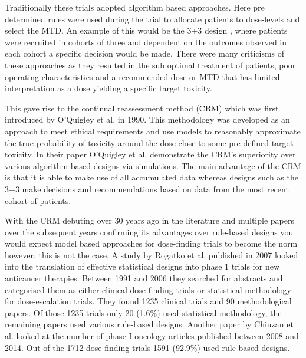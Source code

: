 Traditionally these trials adopted algorithm based approaches. Here pre determined rules were used during the trial to allocate patients to dose-levels and select the MTD. An example of this would be the 3+3 design \cite{storerDesignAnalysisPhase1989}, where patients were recruited in cohorts of three and dependent on the outcomes observed in each cohort a specific decision would be made. There were many criticisms of these approaches as they resulted in the sub optimal treatment of patients, poor operating characteristics and a recommended dose or MTD that has limited interpretation as a dose yielding a specific target toxicity. 

This gave rise to the continual reassessment method (CRM) which was first introduced by O'Quigley et al. \cite{oquigleyContinualReassessmentMethod1990} in 1990. This methodology was developed as an approach to meet ethical requirements and use models to reasonably approximate the true probability of toxicity around the dose close to some pre-defined target toxicity. In their paper O'Quigley et al. \cite{oquigleyContinualReassessmentMethod1990} demonstrate the CRM's superiority over various algorithm based designs via simulations. The main advantage of the CRM is that it is able to make use of all accumulated data whereas designs such as the 3+3 make decisions and recommendations based on data from the most recent cohort of patients.

With the CRM debuting over 30 years ago in the literature and multiple papers over the subsequent years confirming its advantages over rule-based designs you would expect model based approaches for dose-finding trials to become the norm however, this is not the case. A study by Rogatko et al. \cite{rogatkoTranslationInnovativeDesigns2007} published in 2007 looked into the translation of effective statistical designs into phase 1 trials for new anticancer therapies. Between 1991 and 2006 they searched for abstracts and categorised them as either clinical dose-finding trials or statistical methodology for dose-escalation trials. They found 1235 clinical trials and 90 methodological papers. Of those 1235 trials only 20 (1.6\%) used statistical methodology, the remaining papers used various rule-based designs. Another paper by Chiuzan et al. \cite{chiuzanDosefindingDesignsTrials2017} looked at the number of phase \RN{1} oncology articles published between 2008 and 2014. Out of the 1712 dose-finding trials 1591 (92.9\%) used rule-based designs. 

